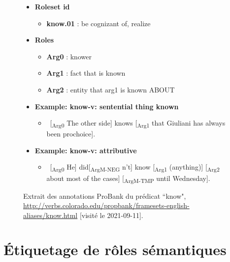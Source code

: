 \documentclass{KodeBook}
\begin{document}
\begin{figure}[ht]
	\centering
\begin{tcolorbox}[colback=white, colframe=blue, boxrule=1pt, text width=.85\textwidth]
	\footnotesize
	\begin{itemize}
		\item \textbf{Roleset id}
		\begin{itemize}\scriptsize
			\item \textbf{know.01} : be cognizant of, realize
		\end{itemize}
		\item \textbf{Roles}
		\begin{itemize}\scriptsize
			\item \textbf{Arg0} : knower
			\item \textbf{Arg1} : fact that is known
			\item \textbf{Arg2} : entity that arg1 is known ABOUT
		\end{itemize}
		
		\item \textbf{Example: know-v: sentential thing known}
		\begin{itemize}\scriptsize
			\item \ [\textsubscript{\color{red}Arg0} The other side] knows [\textsubscript{\color{red}Arg1} that Giuliani has always been prochoice].
		\end{itemize}
		
		\item \textbf{Example: know-v: attributive}
		\begin{itemize}\scriptsize
			\item \ [\textsubscript{\color{red}Arg0} He] did[\textsubscript{\color{red}ArgM-NEG} n't] know [\textsubscript{\color{red}Arg1} (anything)] [\textsubscript{\color{red}Arg2} about most of the cases] [\textsubscript{\color{red}ArgM-TMP} until Wednesday].
		\end{itemize}
	\end{itemize}\vspace*{-1cm}
\end{tcolorbox}
	\caption[Extrait des annotations ProBank d'un prédicat.]{Extrait des annotations ProBank du prédicat ``know", \url{http://verbs.colorado.edu/propbank/framesets-english-aliases/know.html} [visité le 2021-09-11].}
	\label{fig:propbank-predicat}
\end{figure}

\section{Étiquetage de rôles sémantiques}
\end{document}

